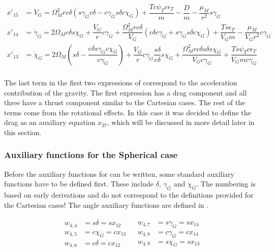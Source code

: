 \begin{equation} \label{eq:dynEqSp}
\begin{split}
x'_{15} &= \dot{V}_{G} =  \Omega_{M}^{2} r c\delta \left(s\gamma_{G}c\delta-c\gamma_{G}s\delta c\chi_{G}\right)+\dfrac{Tc\psi_{T}c\epsilon_{T}}{m}-\dfrac{D}{m}-\dfrac{\mu_{M}}{r^{2}}s\gamma_{G} \\
x'_{14} &= \dot{\gamma}_{G} = 2\Omega_{M}c\delta s\chi_{G} + \dfrac{V_{G}}{r}c\gamma_{G}+\dfrac{\Omega_{M}^{2}r c\delta}{V_{G}}\left(c\delta c\gamma_{G}+s\gamma_{G} s\delta c\chi_{G}\right)+\dfrac{T s\epsilon_{T}}{V_{G}m}-\dfrac{\mu_{M}}{V_{G}r^{2}}c\gamma_{G} \\
x'_{13} &= \dot{\chi}_{G} = 2 \Omega_{M} \left(s\delta-\dfrac{c\delta s\gamma_{G} c\chi_{G}}{c \gamma_{G}}\right)+\dfrac{V_{G}}{r}c\gamma_{G}\dfrac{s\delta}{c \delta}s\chi_{G}+\dfrac{\Omega_{M}^{2}r c\delta s\delta s\chi_{G}}{V_{G}c\gamma_{G}}+\dfrac{T s\psi_{T}c\epsilon_{T}}{V_{G}m c\gamma_{G}} \\
\end{split}
\end{equation}

The last term in the first two expressions of  correspond to the acceleration contribution of the gravity. The first expression has a drag component and all three have a thrust component similar to the Cartesian cases. The rest of the terms come from the rotational effects. In this case it was decided to define the drag as an auxiliary equation $x_{27}$, which will be discussed in more detail later in this section.

\subsubsection{Auxiliary functions for the Spherical case}
\label{subsubsec:auxFspher}
Before the auxiliary functions for  can be written, some standard auxiliary functions have to be defined first. These include $\delta$, $\gamma_{G}$ and $\chi_{G}$. The numbering is based on early derivations and do not correspond to the definitions provided for the Cartesian cases! The angle auxiliary functions are defined in .

\begin{align} \label{eq:SpherAnglF}
\begin{split}
w_{4,4} &= s\delta = s x_{12}  \\
w_{4,5} &= c\chi_{G} = c x_{13} \\
w_{4,6} &= c\delta = c x_{12} \\
\end{split}
&
\begin{split}
w_{4,7} &= s\gamma_{G} = s x_{14} \\
w_{4,8} &= c\gamma_{G} = c x_{14} \\
w_{4,9} &= s\chi_{G} = s x_{13} \\
\end{split}
\end{align}


